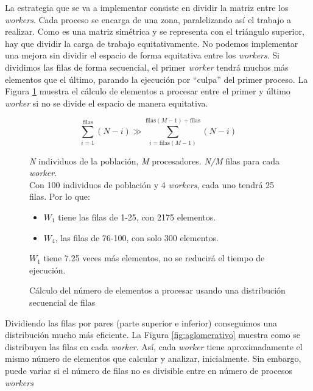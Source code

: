 		La estrategia que se va a implementar consiste en dividir la matriz entre los \textit{workers}. Cada proceso se encarga de una zona, paralelizando así el trabajo a realizar. Como es una matriz simétrica y se representa con el triángulo superior, hay que dividir la carga de trabajo equitativamente. No podemos implementar una mejora sin dividir el espacio de forma equitativa entre los \textit{workers}. Si dividimos las filas de forma secuencial, el primer \textit{worker} tendrá muchos más elementos que el último, parando la ejecución por ``culpa'' del primer proceso. La Figura \ref{fig:prueba} muestra el cálculo de elementos a procesar entre el primer y último \textit{worker} si no se divide el espacio de manera equitativa. 
		
		
		
		\begin{figure}[!h]		
		\begin{mdframed}[roundcorner=5pt]
			\[
			\sum_{i=1}^{\text{filas}} (N - i) \gg \sum_{i=\text{filas}(M-1)}^{\text{filas}(M-1) + \text{filas}} (N - i)
			\]
			\begin{tcolorbox}[boxrule=0.5pt, fontupper=\small]
				
				\textit{N} individuos de la población, \textit{M} procesadores. \textit{N/M} filas para cada \textit{worker}.\\
				
				Con 100 individuos de población y 4 \textit{workers}, cada uno tendrá 25 filas. Por lo que:
				\begin{itemize}
					\item \(W_{1}\) tiene las filas de 1-25, con 2175 elementos. 
					\item \(W_{4}\), las filas de 76-100, con solo 300 elementos. 					
				\end{itemize}
				
				\(W_{1}\) tiene 7.25 veces más elementos, no se reducirá el tiempo de ejecución.
				
							
			\end{tcolorbox}
			
		\end{mdframed}
		
		\caption{Cálculo del número de elementos a procesar usando una distribución secuencial de filas}
		\label{fig:prueba}
		\end{figure}
		
		
		Dividiendo las filas por pares (parte superior e inferior) conseguimos una distribución mucho más eficiente. La Figura \ref{fig:aglomerativo} muestra como se distribuyen las filas en cada \textit{worker}. Así, cada \textit{worker} tiene aproximadamente el mismo número de elementos que calcular y analizar, inicialmente. Sin embargo, puede variar si el número de filas no es divisible entre en número de procesos \textit{workers} 
		
